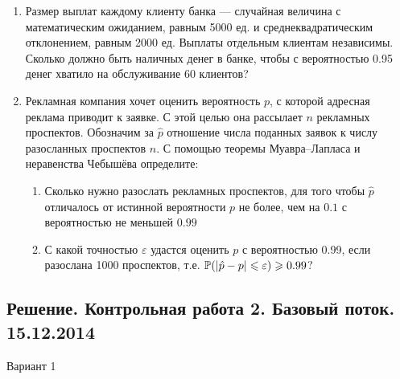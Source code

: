 \documentclass[12pt, a4paper]{article}\usepackage[]{graphicx}\usepackage[]{color}
\begin{document}
\begin{enumerate}
\item Размер выплат каждому клиенту банка — случайная величина с математическим
ожиданием, равным 5000 ед. и среднеквадратическим отклонением, равным 2000 ед.
Выплаты отдельным клиентам независимы. Сколько должно быть наличных денег в банке,
чтобы с вероятностью 0.95 денег хватило на обслуживание 60 клиентов?

\item Рекламная компания хочет оценить вероятность $p$, с которой адресная реклама приводит к
заявке. С этой целью она  рассылает $n$ рекламных проспектов. Обозначим за $\hat p$ отношение
числа поданных заявок к числу разосланных проспектов $n$. С помощью теоремы Муавра–Лапласа и неравенства Чебышёва определите:
\begin{enumerate}
\item  Сколько нужно разослать рекламных проспектов, для того чтобы $\hat p$ отличалось от
истинной вероятности $p$ не более, чем на $0.1$ с вероятностью не меньшей $0.99$
\item С какой точностью $\varepsilon$ удастся оценить $p$ с вероятностью 0.99, если разослана 1000
проспектов, т.е. $\P(|\hat p - p|\leq \varepsilon)\geq 0.99$?
\end{enumerate}
\end{enumerate}





\subsection{Решение. Контрольная работа 2. Базовый поток. 15.12.2014}

\begin{center}
Вариант 1
\end{center}
\end{document}
